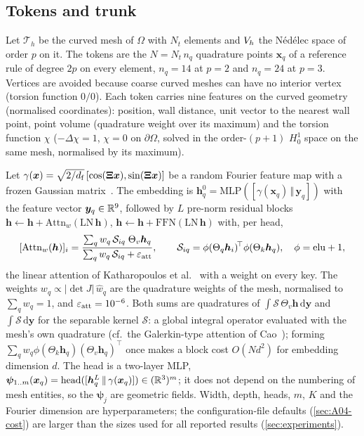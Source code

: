 \subsection{Tokens and trunk}\label{sec:04-trunk}

Let $\mathcal T_h$ be the curved mesh of $\Omega$ with $N_t$ elements and $V_h$ the Nédélec space of order $p$ on it.
The tokens are the $N=N_t\,n_q$ quadrature points $\bm x_q$ of a reference rule of degree $2p$ on every element, $n_q=14$ at $p=2$ and $n_q=24$ at $p=3$.
Vertices are avoided because coarse curved meshes can have no interior vertex (torsion function $0/0$).
Each token carries nine features on the curved geometry (normalised coordinates): position, wall distance, unit vector to the nearest wall point, point volume (quadrature weight over its maximum) and the torsion function $\chi$ ($-\Delta\chi=1$, $\chi=0$ on $\partial\Omega$, solved in the order-$(p+1)$ $H^1_0$ space on the same mesh, normalised by its maximum).

Let $\gamma(\bm x)=\sqrt{2/d_{\rm f}}\,[\cos(\bm\Xi\bm x),\sin(\bm\Xi\bm x)]$ be a random Fourier feature map with a frozen Gaussian matrix~\cite{rahimi2007random,tancik2020fourier}.
The embedding is $\bm h^0_q=\mathrm{MLP}([\gamma(\bm x_q)\,\Vert\,\bm y_q])$ with the feature vector $\bm y_q\in\mathbb{R}^9$, followed by $L$ pre-norm residual blocks $\bm h\leftarrow\bm h+\mathrm{Attn}_w(\mathrm{LN}\,\bm h)$, $\bm h\leftarrow\bm h+\mathrm{FFN}(\mathrm{LN}\,\bm h)$ with, per head,
\begin{equation}\label{eq:04-attn}
  [\mathrm{Attn}_w(\bm h)]_i=\frac{\sum_{q} w_q\,\mathcal S_{iq}\;\Theta_v\bm h_q}{\sum_{q} w_q\,\mathcal S_{iq}+\varepsilon_{\rm att}},\qquad
  \mathcal S_{iq}=\phi(\Theta_q\bm h_i)^{\!\top}\phi(\Theta_k\bm h_q),\quad \phi=\mathrm{elu}+1,
\end{equation}
the linear attention of Katharopoulos et al.~\cite{katharopoulos2020transformers} with a weight on every key.
The weights $w_q\propto|\det J|\,\hat w_q$ are the quadrature weights of the mesh, normalised to $\sum_qw_q=1$, and $\varepsilon_{\rm att}=10^{-6}$.
Both sums are quadratures of $\int\mathcal S\,\Theta_v\bm h\,\mathrm d\bm y$ and $\int\mathcal S\,\mathrm d\bm y$ for the separable kernel $\mathcal S$: a global integral operator evaluated with the mesh's own quadrature (cf.\ the Galerkin-type attention of Cao~\cite{cao2021choose}); forming $\sum_q w_q\phi(\Theta_k\bm h_q)(\Theta_v\bm h_q)^{\!\top}$ once makes a block cost $O(Nd^2)$ for embedding dimension $d$.
The head is a two-layer MLP, $\bm\psi_{1..m}(\bm x_q)=\mathrm{head}([\bm h^L_q\,\Vert\,\gamma(\bm x_q)])\in(\mathbb{R}^3)^m$; it does not depend on the numbering of mesh entities, so the $\bm\psi_j$ are geometric fields.
Width, depth, heads, $m$, $K$ and the Fourier dimension are hyperparameters; the configuration-file defaults (\cref{sec:A04-cost}) are larger than the sizes used for all reported results (\cref{sec:experiments}).

